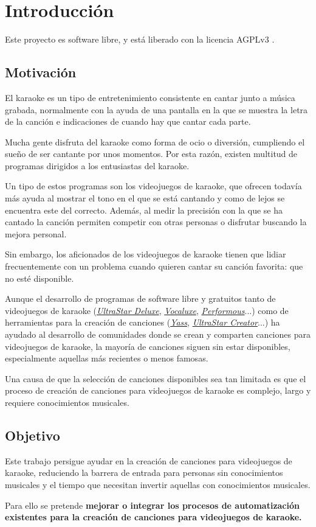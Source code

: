 \chapter{Introducción}

Este proyecto es software libre, y está liberado con la licencia AGPLv3 \cite{agpl}.

\section{Motivación}
\label{sec:motivation}

El karaoke es un tipo de entretenimiento consistente en cantar junto a música grabada, normalmente con la ayuda de una pantalla en la que se muestra la letra de la canción e indicaciones de cuando hay que cantar cada parte.

Mucha gente disfruta del karaoke como forma de ocio o diversión, cumpliendo el sueño de ser cantante por unos momentos. Por esta razón, existen multitud de programas dirigidos a los entusiastas del karaoke.

Un tipo de estos programas son los videojuegos de karaoke, que ofrecen todavía más ayuda al mostrar el tono en el que se está cantando y como de lejos se encuentra este del correcto. Además, al medir la precisión con la que se ha cantado la canción permiten competir con otras personas o disfrutar buscando la mejora personal.

Sin embargo, los aficionados de los videojuegos de karaoke tienen que lidiar frecuentemente con un problema cuando quieren cantar su canción favorita: que no esté disponible.

Aunque el desarrollo de programas de software libre y gratuitos tanto de videojuegos de karaoke (\href{https://github.com/UltraStar-Deluxe/USDX}{\textit{UltraStar Deluxe}}, \href{https://github.com/Vocaluxe/Vocaluxe}{\textit{Vocaluxe}}, \href{https://github.com/performous/performous}{\textit{Performous}}...) como de herramientas para la creación de canciones (\href{https://github.com/sarutasan72/Yass}{\textit{Yass}}, \href{https://github.com/UltraStar-Deluxe/UltraStar-Creator}{\textit{UltraStar Creator}}...) ha ayudado al desarrollo de comunidades donde se crean y comparten canciones para videojuegos de karaoke, la mayoría de canciones siguen sin estar disponibles, especialmente aquellas más recientes o menos famosas.

Una causa de que la selección de canciones disponibles sea tan limitada es que el proceso de creación de canciones para videojuegos de karaoke es complejo, largo y requiere conocimientos musicales.


\section{Objetivo}

Este trabajo persigue ayudar en la creación de canciones para videojuegos de karaoke, reduciendo la barrera de entrada para personas sin conocimientos musicales y el tiempo que necesitan invertir aquellas con conocimientos musicales.


Para ello se pretende \textbf{mejorar o integrar los procesos de automatización existentes para la creación de canciones para videojuegos de karaoke.}